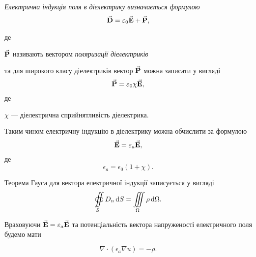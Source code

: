 \begin{definition}
	\it{Електрична індукція} поля в діелектрику визначається формулою 
	\begin{equation}
		{\vec{\mathbf{D}}} = \varepsilon_0 {\vec{\mathbf{E}}} + {\vec{\mathbf{P}}},
	\end{equation}
\end{definition}
де 
\begin{definition}
	${\vec{\mathbf{P}}}$ називають вектором \it{поляризації діелектриків}
\end{definition}
та для широкого класу діелектриків вектор ${\vec{\mathbf{P}}}$ можна записати у вигляді
\begin{equation}
	{\vec{\mathbf{P}}} = \varepsilon_0 \chi {\vec{\mathbf{E}}},
\end{equation}
де
\begin{definition}
	$\chi$ --- діелектрична сприйнятливість діелектрика. 
\end{definition}

Таким чином електричну індукцію в діелектрику можна обчислити за формулою 
\begin{equation}
	{\vec{\mathbf{E}}} = \varepsilon_a {\vec{\mathbf{E}}},
\end{equation}
де
\begin{equation}
	\epsilon_a = \epsilon_0 (1 + \chi).
\end{equation}

Теорема Гауса для вектора електричної індукції записується у вигляді
\begin{equation}
	\displaystyle\oiint\limits_S D_n \mathop{}\!\mathrm{d} S = \displaystyle\iiint\limits_\Omega \rho \mathop{}\!\mathrm{d} \Omega.
\end{equation}

Враховуючи ${\vec{\mathbf{E}}} = \varepsilon_a {\vec{\mathbf{E}}}$ та потенціальність вектора напруженості електричного поля будемо мати 
\begin{th_equation}
	\begin{equation}
		\nabla \cdot (\epsilon_a \nabla u) = - \rho.
	\end{equation}
\end{th_equation}


